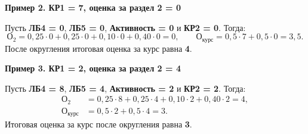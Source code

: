 \documentclass[a4paper,12pt]{extarticle}
\begin{document}
\medskip
\noindent\textbf{Пример 2. КР1 = 7, оценка за раздел 2 = 0}\par
Пусть \textbf{ЛБ4 = 0}, \textbf{ЛБ5 = 0}, \textbf{Активность = 0} и
\textbf{КР2 = 0}. Тогда:
\[
\text{О}_2 = 0{,}25\cdot 0 + 0{,}25\cdot 0 + 0{,}10\cdot 0
    + 0{,}40\cdot 0 = 0,
\qquad
\text{О}_{\text{курс}} = 0{,}5\cdot 7 + 0{,}5\cdot 0 = 3{,}5.
\]
После округления итоговая оценка за курс равна \textbf{4}.

\medskip
\noindent\textbf{Пример 3. КР1 = 2, оценка за раздел 2 = 4}\par
Пусть \textbf{ЛБ4 = 8}, \textbf{ЛБ5 = 4}, \textbf{Активность = 2} и
\textbf{КР2 = 2}. Тогда:
\[
\begin{aligned}
    \text{О}_2 &= 0{,}25\cdot 8 + 0{,}25\cdot 4 + 0{,}10\cdot 2
        + 0{,}40\cdot 2 = 4,\\
    \text{О}_{\text{курс}} &= 0{,}5\cdot 2 + 0{,}5\cdot 4 = 3.
\end{aligned}
\]
Итоговая оценка за курс после округления равна \textbf{3}.
\end{document}
